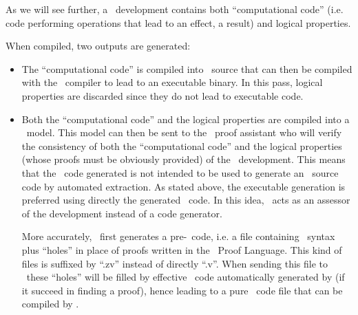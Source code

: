 As we will see further, a \focal\ development contains both
``computational code'' (i.e. code performing operations that lead to
an effect, a result) and logical properties.

\smallskip
When compiled, two outputs are generated:
\begin{itemize}
  \item The ``computational code'' is compiled into \ocaml\ source
    that can then be compiled with the \ocaml\ compiler to lead to an
    executable binary. In this pass, logical properties are discarded
    since they do not lead to executable code.
  \item Both the ``computational code'' and the logical properties are
    compiled into a \coq\ model. This model can then be sent to the
    \coq\ proof assistant who will verify the consistency of both the
    ``computational code'' and the logical properties (whose
    proofs must be obviously provided) of the
    \focal\ development. This means that the \coq\ code generated is
    not intended to be used to generate an \ocaml\ source code by
    automated extraction. As stated above, the executable generation
    is preferred using directly the generated \ocaml\ code. In this
    idea, \coq\ acts as an assessor of the development instead of a
    code generator.

    More accurately, \focal\ first generates a pre-\coq\ code, i.e. a
    file containing \coq\ syntax plus ``holes'' in place of proofs
    written in the \focal\ Proof Language. This kind of files is
    suffixed by ``.zv'' instead of directly ``.v''. When sending this
    file to \zenon\ these ``holes'' will be filled by effective
    \coq\ code automatically generated by \zenon (if it succeed in
    finding a proof), hence leading to a pure \coq\ code file that can
    be compiled by \coq.
\end{itemize}
